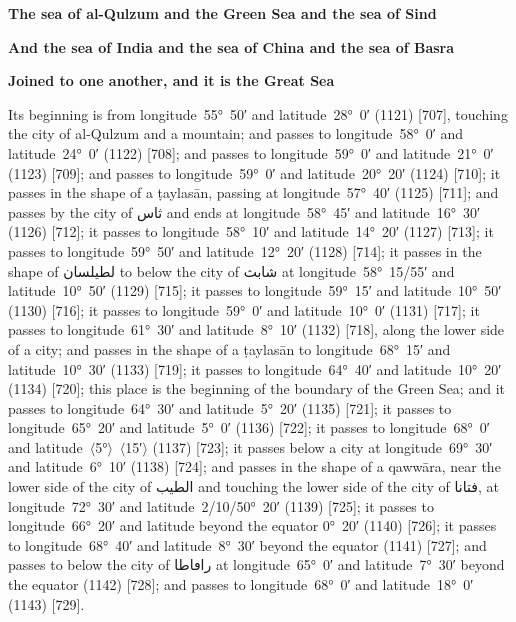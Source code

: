 \documentclass[11pt]{article}
\newcommand{\Pg}[1]{\marginpar{\footnotesize #1}}
\newcommand{\Ang}[1]{\ensuremath{#1}}
\begin{document}
\par\medskip\begin{center}\bfseries The sea of al-Qulzum and the Green Sea and the sea of Sind\end{center}\par

\par\medskip\begin{center}\bfseries And the sea of India and the sea of China and the sea of Basra\end{center}\par

\par\medskip\begin{center}\bfseries Joined to one another, and it is the Great Sea\end{center}\par

Its beginning is from longitude~55°~50′ and latitude~28°~0′ (1121) [707], touching the city of al-Qulzum and a mountain; and passes to longitude~58°~0′ and latitude~24°~0′ (1122) [708]; and passes to longitude~59°~0′ and latitude~21°~0′ (1123) [709]; and passes to longitude~59°~0′ and latitude~20°~20′ (1124) [710]; it passes in the shape of a ṭaylasān, passing at longitude~57°~40′ (1125) [711]; and passes by the city of \textarabic{ثاس} and ends at longitude~58°~45′ and latitude~16°~30′ (1126) [712]; it passes to longitude~58°~10′ and latitude~14°~20′ (1127) [713]; it passes to longitude~59°~50′ and latitude~12°~20′ (1128) [714]; it passes in the shape of \textarabic{لطيلسان} to below the city of \textarabic{شابث} at longitude~58°~15/55′ and latitude~10°~50′ (1129) [715]; it passes to longitude~59°~15′ and latitude~10°~50′ (1130) [716]; it passes to longitude~59°~0′ and latitude~10°~0′ (1131) [717]; it passes to longitude~61°~30′ and latitude~8°~10′ (1132) [718]\Pg{p. 75}, along the lower side of a city; and passes in the shape of a ṭaylasān to longitude~68°~15′ and latitude~10°~30′ (1133) [719]; it passes to longitude~64°~40′ and latitude~10°~20′ (1134) [720]; this place is the beginning of the boundary of the Green Sea; and it passes to longitude~64°~30′ and latitude~5°~20′ (1135) [721]; it passes to longitude~65°~20′ and latitude~5°~0′ (1136) [722]; it passes to longitude~68°~0′ and latitude~\Ang{\langle}5°\Ang{\rangle}~\Ang{\langle}15′\Ang{\rangle} (1137) [723]; it passes below a city at longitude~69°~30′ and latitude~6°~10′ (1138) [724]; and passes in the shape of a qawwāra, near the lower side of the city of \textarabic{الطيب} and touching the lower side of the city of \textarabic{فتانا}, at longitude~72°~30′ and latitude~2/10/50°~20′ (1139) [725]; it passes to longitude~66°~20′ and latitude beyond the equator 0°~20′ (1140) [726]; it passes to longitude~68°~40′ and latitude~8°~30′ beyond the equator (1141) [727]; and passes to below the city of \textarabic{راڡاطا} at longitude~65°~0′ and latitude~7°~30′ beyond the equator (1142) [728]; and passes to longitude~68°~0′ and latitude~18°~0′ (1143) [729].
\end{document}

